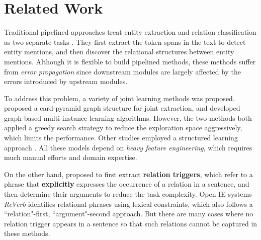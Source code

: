 \documentclass[letterpaper]{article} \usepackage{aaai19}  \usepackage{times}  \usepackage{helvet}  \usepackage{courier}  \usepackage{url}  \usepackage{graphicx}  \frenchspacing  \setlength{\pdfpagewidth}{8.5in}  \setlength{\pdfpageheight}{11in}  \usepackage{amsfonts}
\theoremstyle{definition}
\begin{document}
\section{Related Work}

Traditional pipelined approaches treat entity extraction and relation classification as two separate tasks \cite{mintz2009distant,gormley2015improved,tang2015line}. They first extract the token spans in the text to detect entity mentions, and then discover the relational structures between entity mentions. Although it is flexible to build pipelined methods, these methods suffer from \textit{error propagation} since downstream modules are largely affected by the errors introduced by upstream modules. 

To address this problem, a variety of joint learning methods was proposed. \citeauthor{kate2010joint}  proposed a card-pyramid graph structure for joint extraction, and \citeauthor{hoffmann2011knowledge}  developed graph-based multi-instance learning algorithms. However, the two methods both applied a greedy search strategy to reduce the exploration space aggressively, which limits the performance. Other studies employed a structured learning approach \cite{li2014incremental,miwa2014modeling}. All these models depend on \textit{heavy feature engineering}, which requires much manual efforts and domain expertise. 

On the other hand, \citeauthor{bjorne2011extracting}  proposed to first extract \textbf{relation triggers}, which refer to a phrase that \textbf{explicitly} expresses the occurrence of a relation in a sentence, and then determine their arguments to reduce the task complexity. Open IE systems \textit{ReVerb} \cite{fader2011identifying} identifies relational phrases using lexical constraints, which also follows a ``relation"-first, ``argument"-second approach. But there are many cases where no relation trigger appears in a sentence so that such relations cannot be captured in these methods. 
\end{document}
